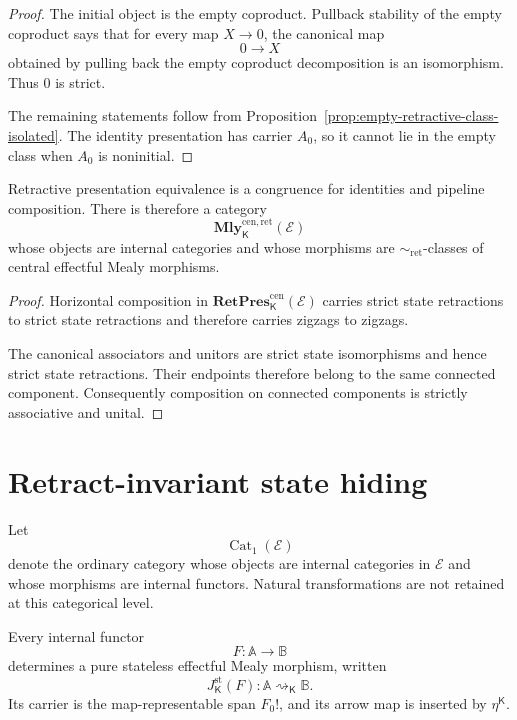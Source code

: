\begin{proof}
The initial object is the empty coproduct.  Pullback stability of the empty
coproduct says that for every map \(X\to0\), the canonical map
\[
    0\longrightarrow X
\]
obtained by pulling back the empty coproduct decomposition is an isomorphism.
Thus \(0\) is strict.

The remaining statements follow from
Proposition~\ref{prop:empty-retractive-class-isolated}.  The identity
presentation has carrier \(A_0\), so it cannot lie in the empty class when
\(A_0\) is noninitial.
\end{proof}

\begin{theorem}
\label{thm:retractive-state-presentation-quotient}
Retractive presentation equivalence is a congruence for identities and
pipeline composition.  There is therefore a category
\[
    \mathbf{Mly}^{\mathrm{cen},\mathrm{ret}}_{\mathsf K}(\mathcal E)
\]
whose objects are internal categories and whose morphisms are
\(\sim_{\mathrm{ret}}\)-classes of central effectful Mealy morphisms.
\end{theorem}

\begin{proof}
Horizontal composition in
\(\mathbf{RetPres}^{\mathrm{cen}}_{\mathsf K}(\mathcal E)\)
carries strict state retractions to strict state retractions and therefore
carries zigzags to zigzags.

The canonical associators and unitors are strict state isomorphisms and hence
strict state retractions.  Their endpoints therefore belong to the same
connected component.  Consequently composition on connected components is
strictly associative and unital.
\end{proof}

\section{Retract-invariant state hiding}
\label{sec:retract-invariant-state-hiding}

Let
\[
    \operatorname{Cat}_1(\mathcal E)
\]
denote the ordinary category whose objects are internal categories in
\(\mathcal E\) and whose morphisms are internal functors.  Natural
transformations are not retained at this categorical level.

Every internal functor
\[
    F:\mathbb A\longrightarrow\mathbb B
\]
determines a pure stateless effectful Mealy morphism, written
\[
    J^{\mathrm{st}}_{\mathsf K}(F):
    \mathbb A\rightsquigarrow_{\mathsf K}\mathbb B.
\]
Its carrier is the map-representable span \(F_0!\), and its arrow map is
inserted by \(\eta^{\mathsf K}\).

